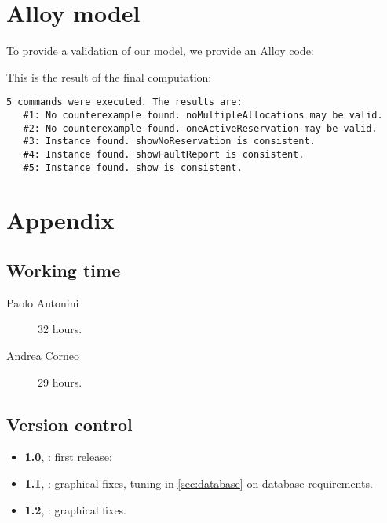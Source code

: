 \chapter{Alloy model}\label{chap:appendix}

To provide a validation of our model, we provide an Alloy code:



This is the result of the final computation:

\begin{Verbatim}[fontsize=\small]
5 commands were executed. The results are:
   #1: No counterexample found. noMultipleAllocations may be valid.
   #2: No counterexample found. oneActiveReservation may be valid.
   #3: Instance found. showNoReservation is consistent.
   #4: Instance found. showFaultReport is consistent.
   #5: Instance found. show is consistent.
\end{Verbatim} 




\backmatter %

\chapter{Appendix}

\section*{Working time}

\begin{description}
	\item [Paolo Antonini] 32 hours.
	\item [Andrea Corneo] 29 hours.
\end{description}


\section*{Version control}
\begin{itemize}
	\item \textbf{1.0}, : first release;
	\item \textbf{1.1}, : graphical fixes, tuning in \cref{sec:database} on database requirements. 
	\item \textbf{1.2}, : graphical fixes.%
\end{itemize}